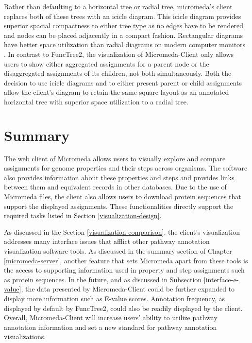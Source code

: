 Rather than defaulting to a horizontal tree or radial tree, micromeda's client 
replaces both of these trees with an icicle diagram. This icicle diagram 
provides superior spacial compactness to either tree type as no edges have to be 
rendered and nodes can be placed adjacently in a compact fashion. Rectangular 
diagrams have better space utilization than radial diagrams on modern computer 
monitors \cite{muramalla2017radial}. In contrast to FuncTree2, the visualization 
of Micromeda-Client only allows users to show either aggregated assignments for 
a parent node or the disaggregated assignments of its children, not both 
simultaneously. Both the decision to use icicle diagrams and to either present 
parent or child assignments allow the client's diagram to retain the same square 
layout as an annotated horizontal tree with superior space utilization to a 
radial tree. 

\section{Summary} \label{micromeda-client-summary}

The web client of Micromeda allows users to visually explore and compare 
assignments for genome properties and their steps across organisms. The software 
also provides information about these properties and steps and provides links 
between them and equivalent records in other databases. Due to the use of 
Micromeda files, the client also allows users to download protein sequences that 
support the displayed assignments. These functionalities directly support the 
required tasks listed in Section \ref{visualization-design}.

As discussed in the Section \ref{visualization-comparison}, the client's 
visualization addresses many interface issues that afflict other pathway 
annotation visualization software tools. As discussed in the summary section of 
Chapter \ref{micromeda-server}, another feature that sets Micromeda apart from 
these tools is the access to supporting information used in property and 
step assignments such as protein sequences. In the future, and as discussed in 
Subsection \ref{interface-e-value}, the data presented by Micromeda-Client could 
be further expanded to display more information such as E-value scores. 
Annotation frequency, as displayed by default by FuncTree2, could also be 
readily displayed by the client. Overall, Micromeda-Client will increase users' 
ability to utilize pathway annotation information and set a new standard for 
pathway annotation visualizations.
